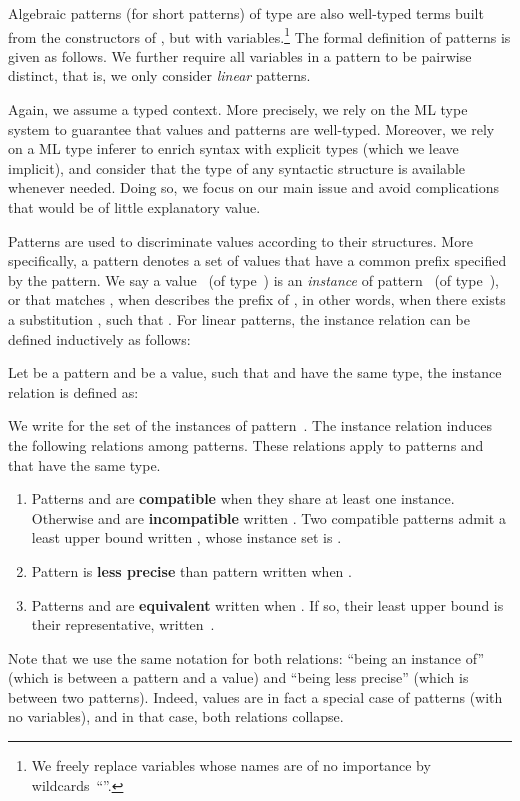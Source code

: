 \documentclass{LMCS}
\renewcommand{\_}{\mathord{\rule[-.25ex]{1ex}{.15ex}}}
\begin{document}
Algebraic patterns (for short patterns) of type  are also well-typed
terms built from the constructors of , but with
variables.\footnote{We freely replace variables
whose names are of no importance by wildcards~``''.} The formal
definition of patterns is given as follows.
We further require all variables in
a pattern to be pairwise distinct, that is, we only consider
\emph{linear} patterns.


Again, we assume a typed context. More precisely, we rely on the ML type
system to guarantee that values and patterns are well-typed.
Moreover, we rely on a ML type inferer to enrich syntax with
explicit types (which we leave implicit), and consider that the
type of any syntactic structure is available whenever needed.
Doing so, we focus on our main issue and avoid complications that would
be of little explanatory value.

Patterns are used to discriminate values according to their
structures. More specifically, a pattern denotes a set of values that
have a common prefix specified by the pattern. We say a value~ (of
type~) is an \emph{instance} of pattern~ (of type~), or
that  matches , when  describes the prefix of , in other words,
when there exists a substitution , such that .  For linear patterns, the instance relation can be defined
inductively as follows:
\begin{defi}[Instance]
  Let  be a pattern and  be a value, such that  and 
  have the same type, the instance relation  is
  defined as:
  
\end{defi}
\noindent We write  for the set of the instances of
pattern~. The instance relation induces the following relations
among patterns. These relations apply to patterns  and 
that have the same type.
\begin{defi} \hfill
\begin{enumerate}[]
\item Patterns  and  are {\bf compatible} when they
  share at least one instance. Otherwise  and  are {\bf
    incompatible} written . Two compatible patterns
  admit a least upper bound written , whose
  instance set is .
\item Pattern  is {\bf less precise} than pattern 
  written  when .
\item Patterns  and  are {\bf equivalent} written  when .  If so, their least
  upper bound is their representative, written~.
\end{enumerate}
\end{defi}
\noindent Note that we use the same notation  for both
relations: ``being an instance of'' (which is between a
pattern and a value) and ``being less precise'' (which is between two
patterns).
Indeed, values are in fact a special case of
patterns (with no variables), and in that case, both relations collapse.
\end{document}
